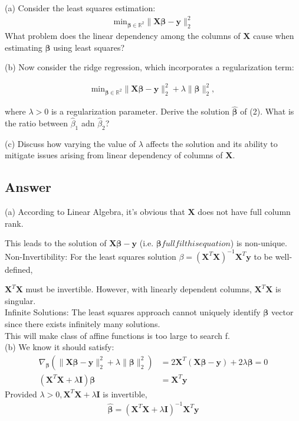 \documentclass[a4paper,12pt]{article}
\newcommand{\R}{\mathbb{R}}
\begin{document}
(a) Consider the least squares estimation:
\begin{align}
    \text{min}_{\bm{\beta} \in \R^2}\|\bm{X}\bm{\beta} - \bm{y}\|_2^2 
\end{align}
What problem does the linear dependency among the columns of \(\bm{X}\) cause when estimating \(\bm{\beta}\) using least squares?

(b) Now consider the ridge regression, which incorporates a regularization term:

\begin{align}
    \text{min}_{\bm{\beta} \in \R^2}\|\bm{X}\bm{\beta} - \bm{y}\|_2^2 + \lambda\|\bm{\beta}\|_2^2,
\end{align}

where \(\lambda > 0\) is a regularization parameter. Derive the solution \(\hat{\bm{\beta}}\) of (2). What is the ratio between \(\hat{\beta}_1\) adn \(\hat{\beta}_2\)?

(c) Discuss how varying the value of \(\lambda\) affects the solution and its ability to mitigate issues arising from linear dependency of columns of \(\bm{X}\).

\subsection*{Answer}
(a) According to Linear Algebra, it's obvious that \(\bm{X}\) does not have full column rank.

This leads to the solution of \(\bm{X}\bm{\beta} - \bm{y}\) (i.e. \(\bm{\beta} fullfil this equation\)) is non-unique. \\

Non-Invertibility: For the least squares solution \(\beta = (\bm{X}^T\bm{X})^{-1}\bm{X}^{T}\bm{y}\) to be well-defined, 

\(\bm{X}^T\bm{X}\) must be invertible. However, with linearly dependent columns, \(\bm{X}^T\bm{X}\) is singular. \\

Infinite Solutions: The least squares approach cannot uniquely identify \(\bm{\beta}\) vector since there exists infinitely many solutions. \\

This will make class of affine functions is too large to search f. \\
(b)
We know it should satisfy:
\begin{align*}
    \nabla_{\bm{\beta}}(\|\bm{X}\bm{\beta} - \bm{y}\|_2^2 + \lambda \|\bm{\beta}\|_2^2) &= 2\bm{X}^T(\bm{X}\bm{\beta} - \bm{y}) + 2\lambda\bm{\beta} = 0  \\
    (\bm{X}^T\bm{X} + \lambda \bm{I})\bm{\beta} &= \bm{X}^T\bm{y}
\end{align*}
Provided \(\lambda > 0, \bm{X}^T \bm{X} + \lambda\bm{I}\) is invertible,
\begin{align*}
    \hat{\bm{\beta}} = (\bm{X}^T\bm{X} + \lambda \bm{I})^{-1}\bm{X}^T\bm{y}
\end{align*}
\end{document}
